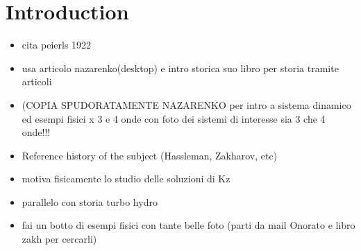 

\newpage
\vphantom{}
\section*{Introduction}
\begin{itemize}
    \item cita peierls 1922
    \item usa articolo nazarenko(desktop) e intro storica suo libro per storia tramite articoli
    \item (COPIA SPUDORATAMENTE NAZARENKO per intro a sistema dinamico ed esempi fisici x 3 e 4 onde con foto dei sistemi di interesse 
    sia 3 che 4 onde!!! 
    \item Reference history of the subject (Hassleman, Zakharov, etc)
    \item motiva fisicamente lo studio delle soluzioni di Kz
    \item parallelo con storia turbo hydro
    \item fai un botto di esempi fisici con tante belle foto (parti da mail Onorato e libro zakh per cercarli)
\end{itemize}


